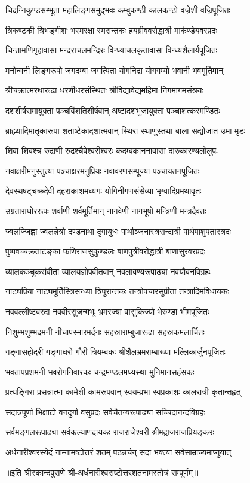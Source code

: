 \twolineshloka
{चिदग्निकुण्डसम्भूता महालिङ्गसमुद्भवः}
{कम्बुकण्ठी कालकण्ठो वज्रेशी वज्रिपूजितः}%

\twolineshloka
{त्रिकण्टकी त्रिभङ्गीशः भस्मरक्षा स्मरान्तकः}
{हयग्रीववरोद्धात्री मार्कण्डेयवरप्रदः}%

\twolineshloka
{चिन्तामणिगृहावासा मन्दराचलमन्दिरः}
{विन्ध्याचलकृतावासा विन्ध्यशैलार्यपूजितः}%

\twolineshloka
{मनोन्मनी लिङ्गरूपो जगदम्बा जगत्पिता}
{योगनिद्रा योगगम्यो भवानी भवमूर्तिमान्}%

\twolineshloka
{श्रीचक्रात्मरथारूढा धरणीधरसंस्थितः}
{श्रीविद्यावेद्यमहिमा निगमागमसंश्रयः}%

\twolineshloka
{दशशीर्षसमायुक्ता पञ्चविंशतिशीर्षवान्}
{अष्टादशभुजायुक्ता पञ्चाशत्करमण्डितः}%

\twolineshloka
{ब्राह्म्यादिमातृकारूपा शताष्टेकादशात्मवान्}
{स्थिरा स्थाणुस्तथा बाला सद्योजात उमा मृडः}%

\twolineshloka
{शिवा शिवश्च रुद्राणी रुद्रश्चैवेश्वरीश्वरः}
{कदम्बकाननावासा दारुकारण्यलोलुपः}%

\twolineshloka
{नवाक्षरीमनुस्तुत्या पञ्चाक्षरमनुप्रियः}
{नवावरणसम्पूज्या पञ्चायतनपूजितः}%

\twolineshloka
{देवस्थषट्चक्रदेवी दहराकाशमध्यगः}
{योगिनीगणसंसेव्या भृग्वादिप्रमथावृतः}%

\twolineshloka
{उग्रताराघोररूपः शर्वाणी शर्वमूर्तिमान्}
{नागवेणी नागभूषो मन्त्रिणी मन्त्रदैवतः}%

\twolineshloka
{ज्वलज्जिह्वा ज्वलन्नेत्रो दण्डनाथा दृगायुधः}
{पार्थाञ्जनास्त्रसन्दात्री पार्थपाशुपतास्त्रदः}%

\twolineshloka
{पुष्पवच्चक्रताटङ्का फणिराजसुकुण्डलः}
{बाणपुत्रीवरोद्धात्री बाणासुरवरप्रदः}%

\twolineshloka
{व्यालकञ्चुकसंवीता व्यालयज्ञोपवीतवान्}
{नवलावण्यरूपाढ्या नवयौवनविग्रहः}%

\twolineshloka
{नाट्यप्रिया नाट्यमूर्तिस्त्रिसन्ध्या त्रिपुरान्तकः}
{तन्त्रोपचारसुप्रीता तन्त्रादिमविधायकः}%

\twolineshloka
{नववल्लीष्टवरदा नववीरसुजन्मभूः}
{भ्रमरज्या वासुकिज्यो भेरुण्डा भीमपूजितः}%

\twolineshloka
{निशुम्भशुम्भदमनी नीचापस्मारमर्दनः}
{सहस्राराम्बुजारूढा सहस्रकमलार्चितः}%

\twolineshloka
{गङ्गासहोदरी गङ्गाधरो गौरी त्रियम्बकः}
{श्रीशैलभ्रमराम्बाख्या मल्लिकार्जुनपूजितः}%

\twolineshloka
{भवतापप्रशमनी भवरोगनिवारकः}
{चन्द्रमण्डलमध्यस्था मुनिमानसहंसकः}%

\twolineshloka
{प्रत्यङ्गिरा प्रसन्नात्मा कामेशी कामरूपवान्}
{स्वयम्प्रभा स्वप्रकाशः कालरात्री कृतान्तहृत्}%

\twolineshloka
{सदान्नपूर्णा भिक्षाटो वनदुर्गा वसुप्रदः}
{सर्वचैतन्यरूपाढ्या सच्चिदानन्दविग्रहः}%

\twolineshloka
{सर्वमङ्गलरूपाढ्या सर्वकल्याणदायकः}
{राजराजेश्वरी श्रीमद्राजराजप्रियङ्करः}%

\twolineshloka
{अर्धनारीश्वरस्येदं नाम्नामष्टोत्तरं शतम्}
{पठन्नर्चन् सदा भक्त्या सर्वसाम्राज्यमाप्नुयात्}%

॥इति श्रीस्कान्दपुराणे श्री-अर्धनारीश्वराष्टोत्तरशतनामस्तोत्रं सम्पूर्णम्॥